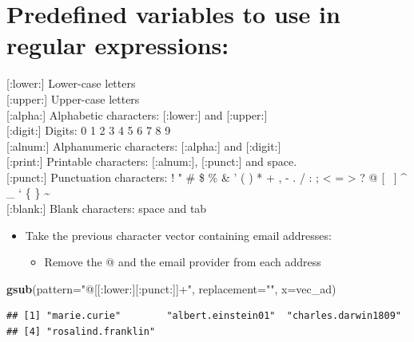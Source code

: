 \documentclass[]{book}
\newenvironment{Shaded}{\begin{snugshade}}{\end{snugshade}}
\newcommand{\DataTypeTok}[1]{\textcolor[rgb]{0.13,0.29,0.53}{#1}}
\newcommand{\KeywordTok}[1]{\textcolor[rgb]{0.13,0.29,0.53}{\textbf{#1}}}
\newcommand{\NormalTok}[1]{#1}
\newcommand{\StringTok}[1]{\textcolor[rgb]{0.31,0.60,0.02}{#1}}
\providecommand{\tightlist}{%
  \setlength{\itemsep}{0pt}\setlength{\parskip}{0pt}}
\begin{document}
\hypertarget{predefined-variables-to-use-in-regular-expressions}{%
\section{Predefined variables to use in regular expressions:}\label{predefined-variables-to-use-in-regular-expressions}}

{[}:lower:{]} \textbar{} Lower-case letters \textbar{}\\
{[}:upper:{]} \textbar{} Upper-case letters \textbar{}\\
{[}:alpha:{]} \textbar{} Alphabetic characters: {[}:lower:{]} and {[}:upper:{]} \textbar{}\\
{[}:digit:{]} \textbar{} Digits: 0 1 2 3 4 5 6 7 8 9 \textbar{}\\
{[}:alnum:{]} \textbar{} Alphanumeric characters: {[}:alpha:{]} and {[}:digit:{]} \textbar{}\\
{[}:print:{]} \textbar{} Printable characters: {[}:alnum:{]}, {[}:punct:{]} and space. \textbar{}\\
{[}:punct:{]} \textbar{} Punctuation characters: ! " \# \$ \% \& ' ( ) * + , - . / : ; \textless{} = \textgreater{} ? @ {[} ~{]} \^{} \_ ` \{ \textbar{} \} \textasciitilde{} \textbar{}\\
{[}:blank:{]} \textbar{} Blank characters: space and tab \textbar{}

\begin{itemize}
\tightlist
\item
  Take the previous character vector containing email addresses:

  \begin{itemize}
  \tightlist
  \item
    Remove the @ and the email provider from each address
  \end{itemize}
\end{itemize}

\begin{Shaded}
\begin{Highlighting}[]
\KeywordTok{gsub}\NormalTok{(}\DataTypeTok{pattern=}\StringTok{"@[[:lower:][:punct:]]+"}\NormalTok{, }
    \DataTypeTok{replacement=}\StringTok{""}\NormalTok{, }
    \DataTypeTok{x=}\NormalTok{vec_ad)}
\end{Highlighting}
\end{Shaded}

\begin{verbatim}
## [1] "marie.curie"        "albert.einstein01"  "charles.darwin1809"
## [4] "rosalind.franklin"
\end{verbatim}
\end{document}
